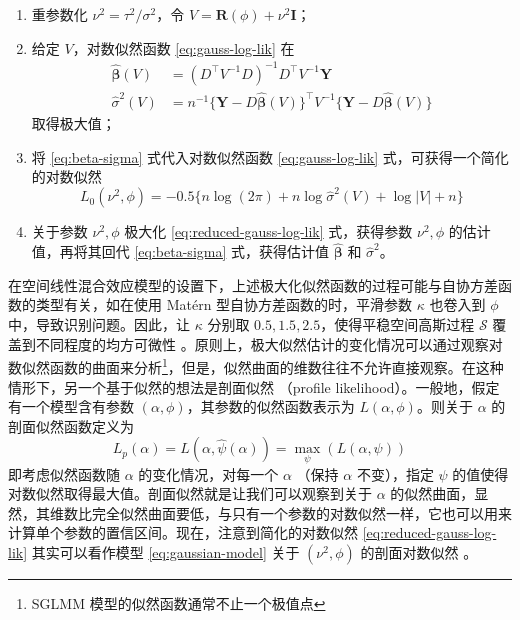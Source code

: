 \documentclass[12pt,a4paper,UTF8,twoside]{book}
\providecommand{\tightlist}{%
  \setlength{\itemsep}{0pt}\setlength{\parskip}{0pt}}
\theoremstyle{definition}
\theoremstyle{definition}
\theoremstyle{definition}
\theoremstyle{remark}
\begin{document}
\begin{enumerate}
\def\labelenumi{\arabic{enumi}.}
\tightlist
\item
  重参数化 \(\nu^2 = \tau^2/\sigma^2\)，令
  \(V = \mathbf{R}(\phi) + \nu^2 \mathbf{I}\)；
\item
  给定 \(V\)，对数似然函数 \eqref{eq:gauss-log-lik} 在 \begin{equation}
  \begin{aligned}
     \hat{\boldsymbol{\beta}}(V) & =  (D^{\top} V^{-1} D)^{-1} D^{\top} V^{-1}\mathbf{Y} \\
     \hat{\sigma}^2(V)           & =  n^{-1} \{\mathbf{Y} - D\hat{\boldsymbol{\beta}}(V)\}^{\top} V^{-1} \{\mathbf{Y} - D\hat{\boldsymbol{\beta}}(V)\}
  \end{aligned} \label{eq:beta-sigma}
  \end{equation} 取得极大值；
\item
  将 \eqref{eq:beta-sigma} 式代入对数似然函数 \eqref{eq:gauss-log-lik}
  式，可获得一个简化的对数似然 \begin{equation}
     L_{0}(\nu^2,\phi) = - 0.5\{ n\log(2\pi) + n\log \hat{\sigma}^2(V) + \log |V| + n \} \label{eq:reduced-gauss-log-lik}
  \end{equation}
\item
  关于参数 \(\nu^2, \phi\) 极大化 \eqref{eq:reduced-gauss-log-lik}
  式，获得参数 \(\nu^2, \phi\) 的估计值，再将其回代 \eqref{eq:beta-sigma}
  式，获得估计值 \(\hat{\boldsymbol{\beta}}\) 和 \(\hat{\sigma}^2\)。
\end{enumerate}

在空间线性混合效应模型的设置下，上述极大化似然函数的过程可能与自协方差函数的类型有关，如在使用
Matérn 型自协方差函数的时，平滑参数 \(\kappa\) 也卷入到 \(\phi\)
中，导致识别问题。因此，让 \(\kappa\) 分别取
\(0.5,1.5,2.5\)，使得平稳空间高斯过程 \(\mathcal{S}\)
覆盖到不同程度的均方可微性
\citep{Warnes1987}。原则上，极大似然估计的变化情况可以通过观察对数似然函数的曲面来分析\footnote{SGLMM
  模型的似然函数通常不止一个极值点}，但是，似然曲面的维数往往不允许直接观察。在这种情形下，另一个基于似然的想法是剖面似然
（profile likelihood）。一般地，假定有一个模型含有参数
\((\alpha,\phi)\)，其参数的似然函数表示为 \(L(\alpha,\phi)\)。则关于
\(\alpha\) 的剖面似然函数定义为 \begin{equation}
L_{p}(\alpha) = L(\alpha,\hat{\psi}(\alpha)) = \max_{\psi} (L(\alpha,\psi))
\label{eq:profile-log-lik}
\end{equation} \noindent 即考虑似然函数随 \(\alpha\)
的变化情况，对每一个 \(\alpha\) （保持 \(\alpha\) 不变），指定 \(\psi\)
的值使得对数似然取得最大值。剖面似然就是让我们可以观察到关于 \(\alpha\)
的似然曲面，显然，其维数比完全似然曲面要低，与只有一个参数的对数似然一样，它也可以用来计算单个参数的置信区间。现在，注意到简化的对数似然
\eqref{eq:reduced-gauss-log-lik} 其实可以看作模型 \eqref{eq:gaussian-model}
关于 \((\nu^2,\phi)\) 的剖面对数似然 \citep{Diggle2007}。
\end{document}
